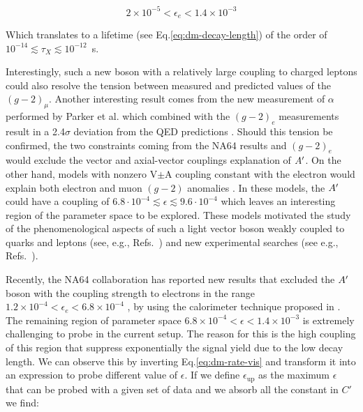 \begin{equation}
  \label{eq:x17-limits}
  2 \times 10^{-5} < \epsilon_e < 1.4 \times 10^{-3}
\end{equation}

Which translates to a lifetime (see Eq.\ref{eq:dm-decay-length}) of the order of $10^{-14}\lesssim \tau_X \lesssim 10^{-12}$~s.

Interestingly, such a new boson with a relatively large coupling to charged leptons could also resolve the tension between measured and predicted values of the $(g - 2)_{\mu}$. Another interesting result comes from the new measurement of $\alpha$ performed by Parker et al. \cite{Parker191} which combined with the $(g-2)_e$ measurements result in a 2.4$\sigma$ deviation from the QED predictions \cite{PhysRevLett.100.120801}. Should this tension be confirmed, the two constraints coming from the NA64 results and $(g - 2)_e$ would exclude the vector and axial-vector couplings explanation of $A'$. On the other hand, models with nonzero V$\pm$A coupling constant with the electron would explain both electron and muon $(g - 2)$ anomalies \cite{Krasnikov:2019dgh}. In these models, the $A'$ could have a coupling of $6.8\cdot 10^{-4} \lesssim \epsilon \lesssim 9.6 \cdot 10^{-4}$ which leaves an interesting region of the parameter space to be explored. These models motivated the study of the phenomenological aspects of such a light vector boson weakly coupled to quarks and leptons (see, e.g., Refs.~\cite{fayet1, fayet2, fayet3, fayet4,jk, cheng, Zhang:2017zap, ia, liang, bart}) and new experimental searches (see e.g., Refs.~\cite{battaglieri2017cosmic, nardi}).

Recently, the NA64 collaboration has reported new results that excluded the $A'$ boson  with the coupling strength  to electrons in the range $1.2 \times 10^{-4} < \epsilon_e < 6.8 \times 10^{-4}$ \cite{Banerjee:2018vgk,Banerjee:2019hmi}, by using the calorimeter technique proposed in \cite{Gninenko:2013rka,Andreas:2013lya}. The remaining region of parameter space $6.8 \times 10^{-4} < \epsilon < 1.4 \times 10^{-3}$ is extremely challenging to probe in the current setup. The reason for this is the high coupling of this region that suppress exponentially the signal yield due to the low decay length. We can observe this by inverting Eq.\ref{eq:dm-rate-vis} and transform it into an expression to probe different value of $\epsilon$. If we define $\epsilon_{\textrm{up}}$ as the maximum $\epsilon$ that can be probed with a given set of data and we absorb all the constant in $C'$ we find:


